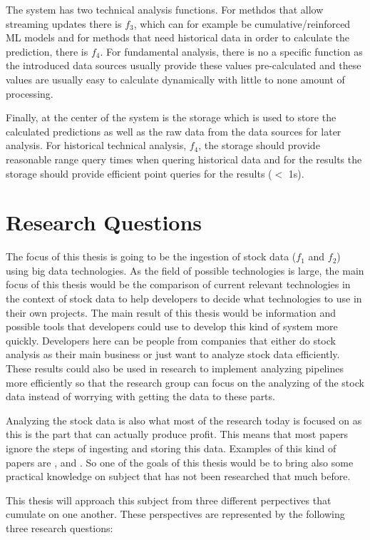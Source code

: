 The system has two technical analysis functions.
For methdos that allow streaming updates there is $f_3$, which can for example be cumulative/reinforced ML models and for methods that need historical data in order to calculate the prediction, there is $f_4$.
For fundamental analysis, there is no a specific function as the introduced data sources usually provide these values pre-calculated and these values are usually easy to calculate dynamically with little to none amount of processing.

Finally, at the center of the system is the storage which is used to store the calculated predictions as well as the raw data from the data sources for later analysis.
For historical technical analysis, $f_4$, the storage should provide reasonable range query times when quering historical data and for the results the storage should provide efficient point queries for the results ($<$ 1s).

\section{Research Questions}

The focus of this thesis is going to be the ingestion of stock data ($f_1$ and $f_2$) using big data technologies.
As the field of possible technologies is large, the main focus of this thesis would be the comparison of current relevant technologies in the context of stock data to help developers to decide what technologies to use in their own projects.
The main result of this thesis would be information and possible tools that developers could use to develop this kind of system more quickly.
Developers here can be people from companies that either do stock analysis as their main business or just want to analyze stock data efficiently.
These results could also be used in research to implement analyzing pipelines more efficiently so that the research group can focus on the analyzing of the stock data instead of worrying with getting the data to these parts.

Analyzing the stock data is also what most of the research today is focused on as this is the part that can actually produce profit.
This means that most papers ignore the steps of ingesting and storing this data.
Examples of this kind of papers are \cite{wu}, \cite{aghakhani} and \cite{kao}.
So one of the goals of this thesis would be to bring also some practical knowledge on subject that has not been researched that much before. 

This thesis will approach this subject from three different perpectives that cumulate on one another.
These perspectives are represented by the following three research questions:

